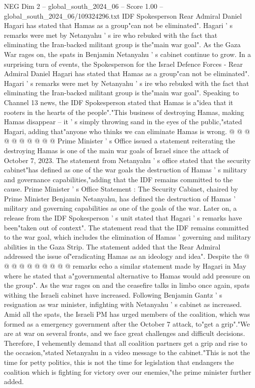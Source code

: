\begin{textsample}{NEG Dim 2 – global\_south\_2024\_06 – Score 1.00 – global\_south\_2024\_06/109324296.txt}  \label{ex:f2_neg_393}
IDF Spokesperson Rear Admiral Daniel Hagari has stated that Hamas as a group"can not be eliminated".
Hagari ' s remarks were met by Netanyahu ' s ire who rebuked with the fact that eliminating the Iran-backed militant group is the"main war goal".
As the Gaza War rages on, the spats in Benjamin Netanyahu ' s cabinet continue to grow.
In a surprising turn of events, the Spokesperson for the Israel Defence Forces - Rear Admiral Daniel Hagari has stated that Hamas as a group"can not be eliminated".
Hagari ' s remarks were met by Netanyahu ' s ire who rebuked with the fact that eliminating the Iran-backed militant group is the"main war goal".
Speaking to Channel 13 news, the IDF Spokesperson stated that Hamas is a"idea that it rooters in the hearts of the people"."This business of destroying Hamas, making Hamas disappear -- it ' s simply throwing sand in the eyes of the public,"stated Hagari, adding that"anyone who thinks we can eliminate Hamas is wrong. @ @ @ @ @ @ @ @ @ @ Prime Minister ' s Office issued a statement reiterating the destroying Hamas is one of the main war goals of Israel since the attack of October 7, 2023.
The statement from Netanyahu ' s office stated that the security cabinet"has defined as one of the war goals the destruction of Hamas ' s military and governance capabilities,"adding that the IDF remains committed to the cause.
Prime Minister ' s Office Statement : The Security Cabinet, chaired by Prime Minister Benjamin Netanyahu, has defined the destruction of Hamas ' military and governing capabilities as one of the goals of the war.
Later on, a release from the IDF Spokesperson ' s unit stated that Hagari ' s remarks have been"taken out of context".
The statement read that the IDF remains committed to the war goal, which includes the elimination of Hamas ' governing and military abilities in the Gaza Strip.
The statement added that the Rear Admiral addressed the issue of"eradicating Hamas as an ideology and idea".
Despite the @ @ @ @ @ @ @ @ @ @ remarks echo a similar statement made by Hagari in May where he stated that a"governmental alternative to Hamas would add pressure on the group".
As the war rages on and the ceasefire talks in limbo once again, spats withing the Israeli cabinet have increased.
Following Benjamin Gantz ' s resignation as war minister, infighting with Netanyahu ' s cabinet as increased.
Amid all the spats, the Israeli PM has urged members of the coalition, which was formed as a emergency government after the October 7 attack, to"get a grip"."We are at war on several fronts, and we face great challenges and difficult decisions.
Therefore, I vehemently demand that all coalition partners get a grip and rise to the occasion,"stated Netanyahu in a video message to the cabinet."This is not the time for petty politics, this is not the time for legislation that endangers the coalition which is fighting for victory over our enemies,"the prime minister further added.

\end{textsample}
